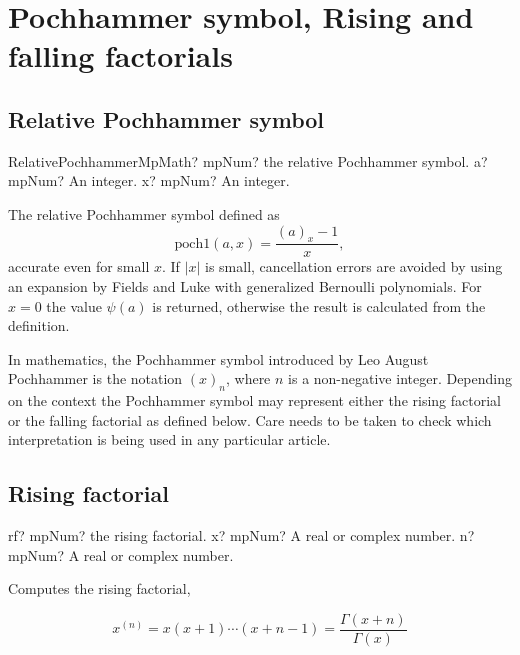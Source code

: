 \newpage
\section{Pochhammer symbol, Rising and falling factorials}
\label{PochhammerSymbol}


\subsection{Relative Pochhammer symbol}

\begin{mpFunctionsExtract}
	\mpFunctionTwoNotImplemented
	{RelativePochhammerMpMath? mpNum? the relative Pochhammer symbol.}
	{a? mpNum? An integer.}
	{x? mpNum? An integer.}
\end{mpFunctionsExtract}

\vspace{0.3cm}
The relative Pochhammer symbol defined as
\begin{equation}
	\text{poch1}(a,x) = \frac{(a)_x - 1}{x},
\end{equation}
accurate even for small $x$. If $|x|$ is small, cancellation errors are avoided by using an expansion by Fields and
Luke with generalized Bernoulli polynomials. For $x = 0$ the value  $\psi(a)$ is returned, otherwise the result is calculated from the definition.




In mathematics, the Pochhammer symbol introduced by Leo August Pochhammer is the notation $(x)_n$, where $n$ is a non-negative integer. Depending on the context the Pochhammer symbol may represent either the rising factorial or the falling factorial as defined below. Care needs to be taken to check which interpretation is being used in any particular article.

\subsection{Rising factorial}

\begin{mpFunctionsExtract}
	\mpFunctionTwo
	{rf? mpNum? the rising factorial.}
	{x? mpNum? A real or complex number.}
	{n? mpNum? A real or complex number.}	
\end{mpFunctionsExtract}


Computes the rising factorial,

\begin{equation}
	x^{(n)} = x(x+1) \cdots (x+n-1) = \frac{\Gamma(x+n)}{\Gamma(x)}
\end{equation}

